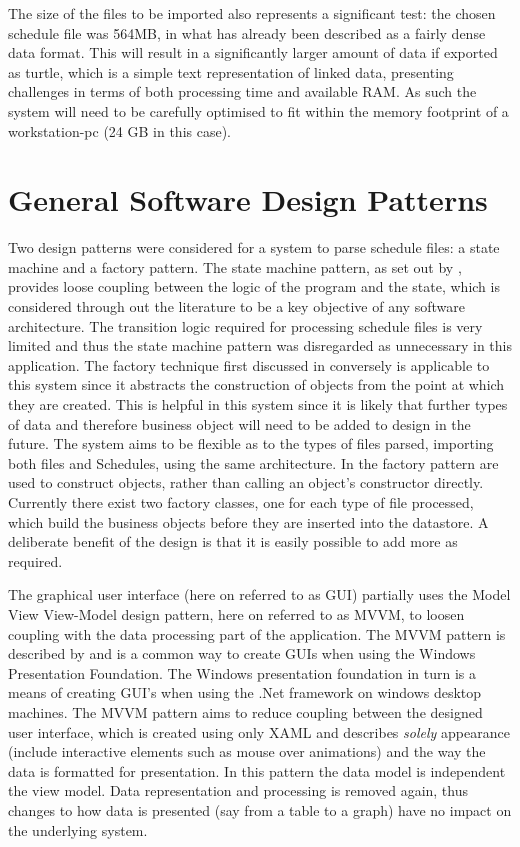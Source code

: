 The size of the files to be imported also represents a significant test: the chosen schedule file was 564MB, in what has already been described as a fairly dense data format. This will result in a significantly larger amount of data if exported as turtle, which is a simple text representation of linked data, presenting challenges in terms of both processing time and available RAM. As such the system will need to be carefully optimised to fit within the memory footprint of a workstation-pc (24 GB in this case).

\section{General Software Design Patterns}
Two design patterns were considered for a system to parse schedule files: a state machine and a factory pattern. The state machine pattern, as set out by \cite{Shalyto2006}, provides loose coupling between the logic of the program and the state, which is considered through out the literature to be a key objective of any software architecture. The transition logic required for processing schedule files is very limited and thus the state machine pattern was disregarded as unnecessary in this application. The factory technique first discussed in \cite{Gamma2002} conversely is applicable to this system since it abstracts the construction of objects from the point at which they are created. This is helpful in this system since it is likely that further types of data and therefore business object will need to be added to design in the future. The system aims to be flexible as to the types of files parsed, importing both  files and Schedules, using the same architecture. In the factory pattern  are used to construct objects, rather than calling an object's constructor directly. Currently there exist two factory classes, one for each type of file processed, which build the business objects before they are inserted into the datastore. A deliberate benefit of the design is that it is easily possible to add more as required.

The graphical user interface (here on referred to as GUI) partially uses the Model View View-Model design pattern, here on referred to as MVVM, to loosen coupling with the data processing part of the application. The MVVM pattern is described by \citet{Microsoft2012} and is a common way to create GUIs when using the Windows Presentation Foundation. The Windows presentation foundation in turn is a means of creating GUI's when using the .Net framework on windows desktop machines. The MVVM pattern aims to reduce coupling between the designed user interface, which is created using only XAML and describes \emph{solely} appearance (include  interactive elements such as mouse over animations) and the way the data is formatted for presentation. In this pattern the data model is independent the view model.  Data representation and processing is removed again, thus changes to how data is presented (say from a table to a graph) have no impact on the underlying system.

